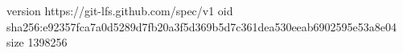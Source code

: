 version https://git-lfs.github.com/spec/v1
oid sha256:e92357fca7a0d5289d7fb20a3f5d369b5d7c361dea530eeab6902595e53a8e04
size 1398256
